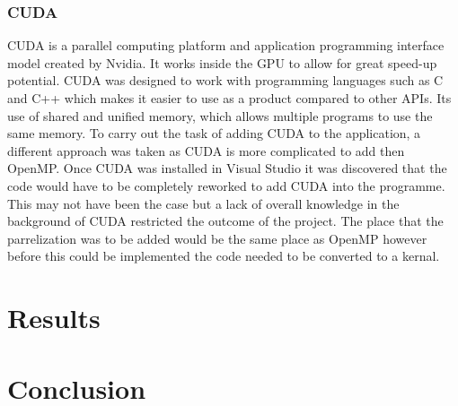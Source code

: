 \documentclass[12pt]{article}
\begin{document}
\subsubsection{CUDA}
CUDA is a  parallel computing platform and application programming interface model created by Nvidia. It works inside the GPU to allow for great speed-up potential. CUDA was designed to work with programming languages such as C and C++ which makes it easier to use as a product compared to other APIs. Its use of shared and unified memory, which allows multiple programs to use the same memory.
\newline
 To carry out the task of adding CUDA to the application, a different approach was taken as CUDA is more complicated to add then OpenMP. Once CUDA was installed in Visual Studio it was discovered that the code would have to be completely reworked to add CUDA into the programme. This may not have been the case but a lack of overall knowledge in the background of CUDA restricted the outcome of the project.
 \newline 
 The place that the parrelization was to be added would be the same place as OpenMP however before this could be implemented the code needed to be converted to a kernal.

\section{Results}

\section{Conclusion}


	
\end{document}
